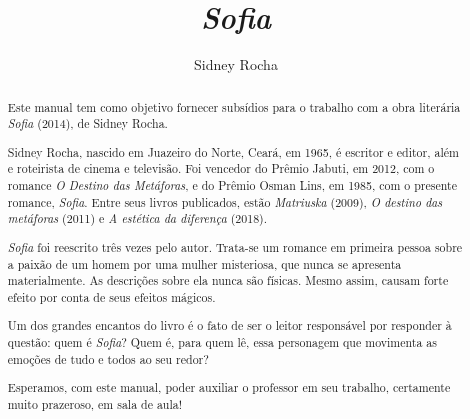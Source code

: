 \documentclass[12pt]{extarticle}
\begin{document}
\newcommand{\AutorLivro}{Sidney Rocha}
\newcommand{\TituloLivro}{\textit{Sofia}}
\newcommand{\Tema}{Ficção, mistério e fantasia}
\newcommand{\Genero}{Romance}
\newcommand{\imagemCapa}{./images/PNLD0054-01.png}
\newcommand{\issnppub}{978-65-55190-86-1}
\newcommand{\issnepub}{978-65-55190-87-8}
\newcommand{\colaborador}{Vicente Castro e Bruno Gradella}


\title{\TituloLivro} \author{\AutorLivro} \def\authornotes{\colaborador}

\date{} \maketitle

\baselineskip\par

\begin{abstract}

Este manual tem como objetivo fornecer subsídios para o trabalho com a obra
  literária \textit{Sofia} (2014), de Sidney Rocha.

Sidney Rocha, nascido em Juazeiro do Norte, Ceará, em 1965, é escritor e
  editor, além e roteirista de cinema e televisão. 
  Foi vencedor do Prêmio Jabuti, em
  2012, com o romance \textit{O Destino das Metáforas}, e do Prêmio Osman Lins,
  em 1985, com o presente romance, \textit{Sofia}. Entre 
  seus livros publicados, estão 
  \textit{Matriuska} (2009), 
  \textit{O destino das metáforas} (2011) e
  \textit{A estética da diferença} (2018).


\textit{Sofia} foi reescrito três vezes pelo autor. Trata-se um romance
  em primeira pessoa sobre a paixão de um homem por uma mulher misteriosa, 
  que nunca se apresenta materialmente. As descrições sobre ela nunca são físicas.
  Mesmo assim, causam forte efeito por conta de seus efeitos mágicos. 

Um dos grandes encantos do livro é o fato de ser o
  leitor responsável por responder à questão: quem é \textit{Sofia}? Quem é, para quem
  lê, essa personagem que movimenta as emoções de tudo e todos ao seu redor?

Esperamos, com este manual, poder auxiliar o professor em seu trabalho,
  certamente muito prazeroso, em sala de aula!


\end{abstract}

\tableofcontents
\end{document}
